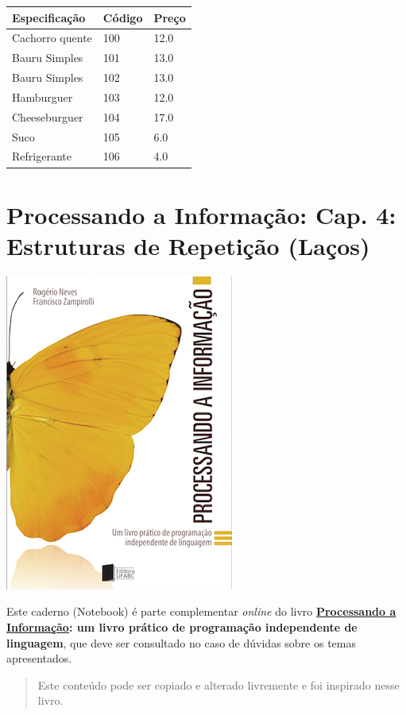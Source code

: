 \documentclass[12pt,a4paper]{article}
\begin{document}
\begin{longtable}[]{@{}lll@{}}
\toprule
Especificação & Código & Preço\tabularnewline
\midrule
\endhead
Cachorro quente & 100 & 12.0\tabularnewline
Bauru Simples & 101 & 13.0\tabularnewline
Bauru Simples & 102 & 13.0\tabularnewline
Hamburguer & 103 & 12.0\tabularnewline
Cheeseburguer & 104 & 17.0\tabularnewline
Suco & 105 & 6.0\tabularnewline
Refrigerante & 106 & 4.0\tabularnewline
\bottomrule
\end{longtable}

    \hypertarget{processando-a-informauxe7uxe3o-cap.-4-estruturas-de-repetiuxe7uxe3o-lauxe7os}{%
\section{Processando a Informação: Cap. 4: Estruturas de Repetição
(Laços)}\label{processando-a-informauxe7uxe3o-cap.-4-estruturas-de-repetiuxe7uxe3o-lauxe7os}}

    \includegraphics{"figs/Capa_Processando_Informacao.jpg"}

Este caderno (Notebook) é parte complementar \emph{online} do livro
\textbf{\href{https://editora.ufabc.edu.br/matematica-e-ciencias-da-computacao/58-processando-a-informacao}{Processando
a Informação}: um livro prático de programação independente de
linguagem}, que deve ser consultado no caso de dúvidas sobre os temas
apresentados.

\begin{quote}
Este conteúdo pode ser copiado e alterado livremente e foi inspirado
nesse livro.
\end{quote}
\end{document}
